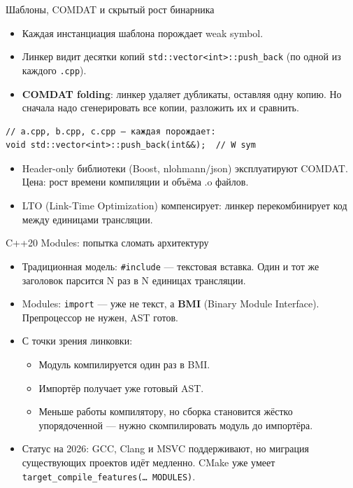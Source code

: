 \documentclass{beamer}
\begin{document}
\begin{frame}[fragile]{Шаблоны, COMDAT и скрытый рост бинарника}
\begin{itemize}
\item Каждая инстанциация шаблона порождает weak symbol.
\item Линкер видит десятки копий \texttt{std::vector<int>::push\_back}
(по одной из каждого \texttt{.cpp}).
\item \textbf{COMDAT folding}: линкер удаляет дубликаты, оставляя одну копию.
Но сначала надо сгенерировать все копии, разложить их и сравнить.
\end{itemize}
\begin{lstlisting}
// a.cpp, b.cpp, c.cpp — каждая порождает:
void std::vector<int>::push_back(int&&);  // W sym
\end{lstlisting}
\begin{itemize}
\item Header-only библиотеки (Boost, nlohmann/json) эксплуатируют COMDAT.
Цена: рост времени компиляции и объёма .o файлов.
\item LTO (Link-Time Optimization) компенсирует: линкер перекомбинирует
код между единицами трансляции.
\end{itemize}
\end{frame}

\begin{frame}{C++20 Modules: попытка сломать архитектуру}
\begin{itemize}
\item Традиционная модель: \texttt{\#include} — текстовая вставка.
Один и тот же заголовок парсится N раз в N единицах трансляции.
\item Modules: \texttt{import} — уже не текст, а \textbf{BMI} (Binary Module Interface).
Препроцессор не нужен, AST готов.
\item С точки зрения линковки:
\begin{itemize}
\item Модуль компилируется один раз в BMI.
\item Импортёр получает уже готовый AST.
\item Меньше работы компилятору, но сборка становится жёстко
упорядоченной — нужно скомпилировать модуль до импортёра.
\end{itemize}
\item Статус на 2026: GCC, Clang и MSVC поддерживают, но миграция
существующих проектов идёт медленно. CMake уже умеет \texttt{target\_compile\_features(… MODULES)}.
\end{itemize}
\end{frame}
\end{document}
